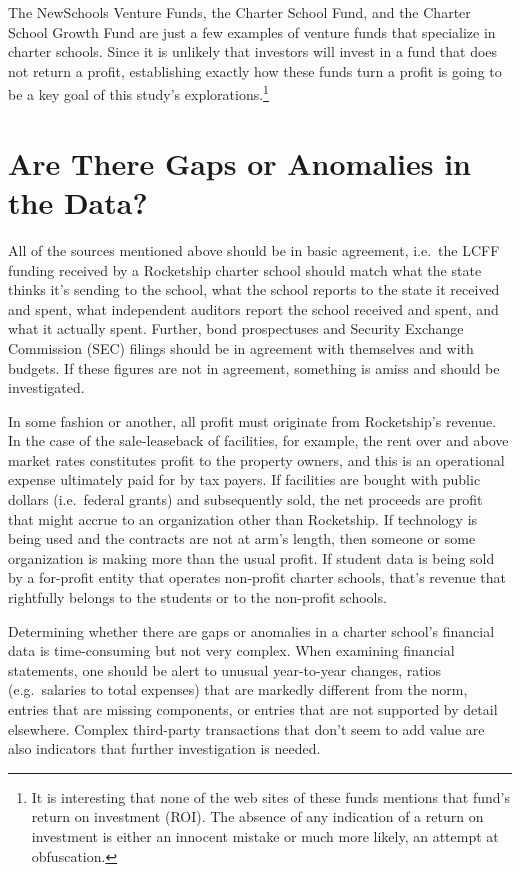The NewSchools Venture Funds, the Charter School Fund, and the Charter School Growth Fund are just a few examples of venture funds that specialize in charter schools. Since it is unlikely that investors will invest in a fund that does not return a profit, establishing exactly how these funds turn a profit is going to be a key goal of this study's explorations.\footnote{It is interesting that none of the web sites of these funds mentions that fund's return on investment (ROI). The absence of any indication of a return on investment is either an innocent mistake or much more likely, an attempt at obfuscation.}

\section{Are There Gaps or Anomalies in the Data?}\label{sec:gaps-anomalies}\indent

All of the sources mentioned above should be in basic agreement, i.e.~the LCFF funding received by a Rocketship charter school should match what the state thinks it's sending to the school, what the school reports to the state it received and spent, what independent auditors report the school received and spent, and what it actually spent. Further, bond prospectuses and Security Exchange Commission (SEC) filings should be in agreement with themselves and with budgets. If these figures are not in agreement, something is amiss and should be investigated.

In some fashion or another, all profit must originate from Rocketship's revenue. In the case of the sale-leaseback of facilities, for example, the rent over and above market rates constitutes profit to the property owners, and this is an operational expense ultimately paid for by tax payers. If facilities are bought with public dollars (i.e.~federal grants) and subsequently sold, the net proceeds are profit that might accrue to an organization other than Rocketship. If technology is being used and the contracts are not at arm's length, then someone or some organization is making more than the usual profit. If student data is being sold by a for-profit entity that operates non-profit charter schools, that's revenue that rightfully belongs to the students or to the non-profit schools. 

Determining whether there are gaps or anomalies in a charter school's financial data is time-consuming but not very complex. When examining financial statements, one should be alert to unusual year-to-year changes, ratios (e.g. salaries to total expenses) that are markedly different from the norm, entries that are missing components, or entries that are not supported by detail elsewhere. Complex third-party transactions that don't seem to add value are also indicators that further investigation is needed.

